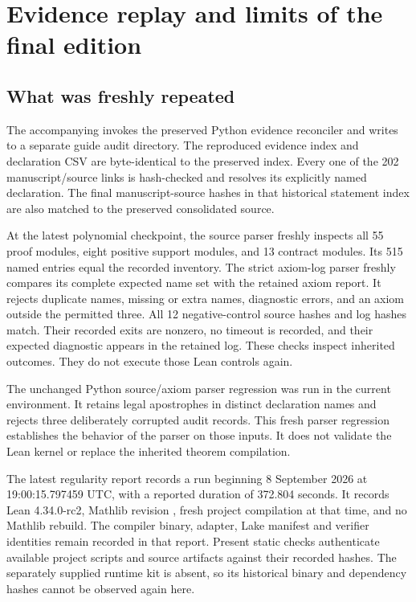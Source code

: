 \section{Evidence replay and limits of the final edition}\label{sec:replay}
\subsection{What was freshly repeated}
The accompanying  invokes the preserved Python evidence reconciler and writes to a separate guide audit directory. The reproduced evidence index and declaration CSV are byte-identical to the preserved index. Every one of the 202 manuscript/source links is hash-checked and resolves its explicitly named declaration. The final manuscript-source hashes in that historical statement index are also matched to the preserved consolidated source.

At the latest polynomial checkpoint, the source parser freshly inspects all 55 proof modules, eight positive support modules, and 13 contract modules. Its 515 named entries equal the recorded inventory. The strict axiom-log parser freshly compares its complete expected name set with the retained axiom report. It rejects duplicate names, missing or extra names, diagnostic errors, and an axiom outside the permitted three. All 12 negative-control source hashes and log hashes match. Their recorded exits are nonzero, no timeout is recorded, and their expected diagnostic appears in the retained log. These checks inspect inherited outcomes. They do not execute those Lean controls again.

The unchanged Python source/axiom parser regression was run in the current environment. It retains legal apostrophes in distinct declaration names and rejects three deliberately corrupted audit records. This fresh parser regression establishes the behavior of the parser on those inputs. It does not validate the Lean kernel or replace the inherited theorem compilation.

The latest regularity report records a run beginning 8 September 2026 at 19:00:15.797459 UTC, with a reported duration of 372.804 seconds. It records Lean 4.34.0-rc2, Mathlib revision , fresh project compilation at that time, and no Mathlib rebuild. The compiler binary, adapter, Lake manifest and verifier identities remain recorded in that report. Present static checks authenticate available project scripts and source artifacts against their recorded hashes. The separately supplied runtime kit is absent, so its historical binary and dependency hashes cannot be observed again here.

